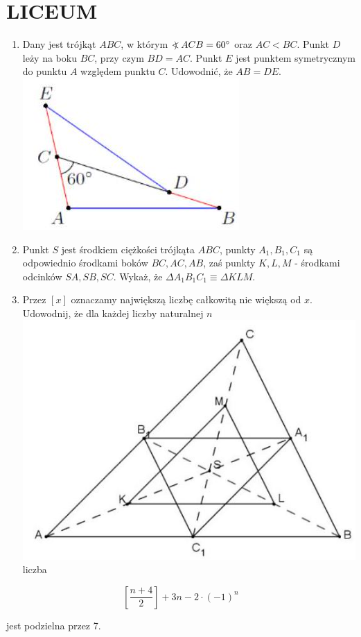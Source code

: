 \documentclass[10pt]{article}
\newcommand\Varangle{\mathop{{<\!\!\!\!\!\text{\small)}}\:}\nolimits}
\begin{document}
\section*{LICEUM}
\begin{enumerate}
  \item Dany jest trójkąt \(A B C\), w którym \(\Varangle A C B=60^{\circ}\) oraz \(A C<B C\). Punkt \(D\) leży na boku \(B C\), przy czym \(B D=A C\). Punkt \(E\) jest punktem symetrycznym do punktu \(A\) względem punktu \(C\). Udowodnić, że \(A B=D E\).\\
\includegraphics[max width=\textwidth, center]{2024_11_21_f2eb1b7285ec9169cbc0g-1(1)}
  \item Punkt \(S\) jest środkiem ciężkości trójkąta \(A B C\), punkty \(A_{1}, B_{1}, C_{1}\) są odpowiednio środkami boków \(B C, A C, A B\), zaś punkty \(K, L, M\) - środkami odcinków \(S A, S B, S C\). Wykaż, że \(\Delta A_{1} B_{1} C_{1} \equiv \Delta K L M\).
  \item Przez \([x]\) oznaczamy największą liczbę całkowitą nie większą od \(x\). Udowodnij, że dla każdej liczby naturalnej \(n\)\\
\includegraphics[max width=\textwidth, center]{2024_11_21_f2eb1b7285ec9169cbc0g-1(2)}\\
liczba
\end{enumerate}

\[
\left[\frac{n+4}{2}\right]+3 n-2 \cdot(-1)^{n}
\]

jest podzielna przez 7.
\end{document}
